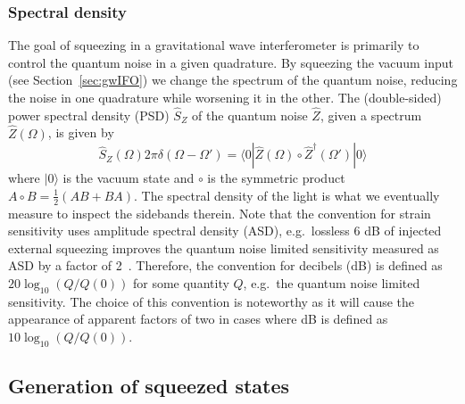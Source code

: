 \documentclass[aps,pra,superscriptaddress,reprint,nofootinbib]{revtex4-1}
\begin{document}
\subsubsection{Spectral density}

The goal of squeezing in a gravitational wave interferometer is primarily to control the quantum noise in a given quadrature. By squeezing the vacuum input (see Section~\ref{sec:gwIFO}) we change the spectrum of the quantum noise, reducing the noise in one quadrature while worsening it in the other. The (double-sided) power spectral density (PSD) $\hat{S}_Z$ of the quantum noise $\hat{Z}$, given a spectrum $\hat{Z}(\Omega)$, is given by
\begin{equation}
\hat{S}_Z(\Omega) 2 \pi \delta(\Omega - \Omega') = \langle0| \hat{Z}(\Omega) \circ \hat{Z}^\dagger(\Omega') |0\rangle
\end{equation}
where $|0\rangle$ is the vacuum state and $\circ$ is the symmetric product $A \circ B = \frac{1}{2}(A B + B A)$.
The spectral density of the light is what we eventually measure to inspect the sidebands therein.
Note that the convention for strain sensitivity uses amplitude spectral density (ASD), e.g.\ lossless 6 dB of injected external squeezing improves the quantum noise limited sensitivity measured as ASD by a factor of 2~\cite{Aasi_2013}.
Therefore, the convention for decibels (dB) is defined as $20 \log_{10}(Q/{Q(0)})$ for some quantity $Q$, e.g.\ the quantum noise limited sensitivity. The choice of this convention is noteworthy as it will cause the appearance of apparent factors of two in cases where dB is defined as $10 \log_{10}(Q/{Q(0)})$.

\subsection{Generation of squeezed states}
\end{document}
